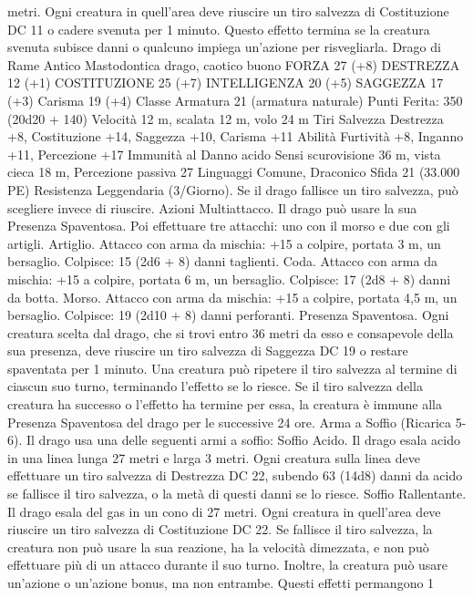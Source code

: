 \begin{multicols}{2}
metri. Ogni creatura in quell’area deve riuscire un tiro salvezza di
Costituzione DC 11 o cadere svenuta per 1 minuto. Questo effetto
termina se la creatura svenuta subisce danni o qualcuno impiega
un’azione per risvegliarla.
Drago di Rame Antico
Mastodontica drago, caotico buono
FORZA 27 (+8)
DESTREZZA 12 (+1)
COSTITUZIONE 25 (+7)
INTELLIGENZA 20 (+5)
SAGGEZZA 17 (+3)
Carisma 19 (+4)
Classe Armatura 21 (armatura naturale)
\hspace*{0pt}\hfill{Punti Ferita}: 350 (20d20 + 140)
Velocità 12 m, scalata 12 m, volo 24 m
Tiri Salvezza Destrezza +8, Costituzione +14, Saggezza +10,
Carisma +11
Abilità Furtività +8, Inganno +11, Percezione +17
Immunità al Danno acido
Sensi scurovisione 36 m, vista cieca 18 m, Percezione passiva 27
Linguaggi Comune, Draconico
Sfida 21 (33.000 PE)
Resistenza Leggendaria (3/Giorno). Se il drago fallisce un tiro
salvezza, può scegliere invece di riuscire.
Azioni
Multiattacco. Il drago può usare la sua Presenza Spaventosa. Poi
effettuare tre attacchi: uno con il morso e due con gli artigli.
Artiglio. Attacco con arma da mischia: +15 a colpire, portata 3
m, un bersaglio.
Colpisce: 15 (2d6 + 8) danni taglienti.
Coda. Attacco con arma da mischia: +15 a colpire, portata 6 m,
un bersaglio.
Colpisce: 17 (2d8 + 8) danni da botta.
Morso. Attacco con arma da mischia: +15 a colpire, portata 4,5
m, un bersaglio.
Colpisce: 19 (2d10 + 8) danni perforanti.
Presenza Spaventosa. Ogni creatura scelta dal drago, che si trovi
entro 36 metri da esso e consapevole della sua presenza, deve
riuscire un tiro salvezza di Saggezza DC 19 o restare spaventata per
1 minuto. Una creatura può ripetere il tiro salvezza al termine di
ciascun suo turno, terminando l’effetto se lo riesce. Se il tiro salvezza
della creatura ha successo o l’effetto ha termine per essa, la creatura è
immune alla Presenza Spaventosa del drago per le successive 24 ore.
Arma a Soffio (Ricarica 5-6). Il drago usa una delle seguenti armi
a soffio:
Soffio Acido. Il drago esala acido in una linea lunga 27 metri e larga 3
metri. Ogni creatura sulla linea deve effettuare un tiro salvezza di
Destrezza DC 22, subendo 63 (14d8) danni da acido se fallisce il tiro
salvezza, o la metà di questi danni se lo riesce.
Soffio Rallentante. Il drago esala del gas in un cono di 27 metri. Ogni
creatura in quell’area deve riuscire un tiro salvezza di Costituzione
DC 22. Se fallisce il tiro salvezza, la creatura non può usare la sua
reazione, ha la velocità dimezzata, e non può effettuare più di un
attacco durante il suo turno. Inoltre, la creatura può usare un’azione o
un’azione bonus, ma non entrambe. Questi effetti permangono 1

\end{multicols}
